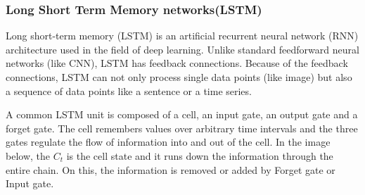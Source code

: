     \subsubsection{Long Short Term Memory networks(LSTM)}
    Long short-term memory (LSTM) is an artificial recurrent neural network (RNN) architecture used in the field of deep learning. Unlike standard feedforward neural networks (like CNN), LSTM has feedback connections. Because of the feedback connections, LSTM can not only process single data points (like image) but also a sequence of data points like a sentence or a time series. 
    
    A common LSTM unit is composed of a cell, an input gate, an output gate and a forget gate. The cell remembers values over arbitrary time intervals and the three gates regulate the flow of information into and out of the cell.
    In the image below, the $C_t $ is the cell state and it runs down the information through the entire chain. On this, the information is removed or added by Forget gate or Input gate. 
